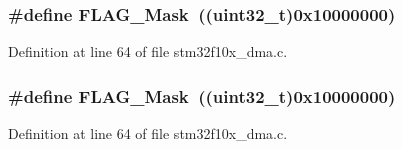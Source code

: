 \subsubsection[{\texorpdfstring{F\+L\+A\+G\+\_\+\+Mask}{FLAG_Mask}}]{\setlength{\rightskip}{0pt plus 5cm}\#define F\+L\+A\+G\+\_\+\+Mask~(({\bf uint32\+\_\+t})0x10000000)}\hypertarget{group___d_m_a___private___defines_ga2be62bf481cd44de9ab604efe5595ff6}{}\label{group___d_m_a___private___defines_ga2be62bf481cd44de9ab604efe5595ff6}


Definition at line 64 of file stm32f10x\+\_\+dma.\+c.

\subsubsection[{\texorpdfstring{F\+L\+A\+G\+\_\+\+Mask}{FLAG_Mask}}]{\setlength{\rightskip}{0pt plus 5cm}\#define F\+L\+A\+G\+\_\+\+Mask~(({\bf uint32\+\_\+t})0x10000000)}\hypertarget{group___d_m_a___private___defines_ga2be62bf481cd44de9ab604efe5595ff6}{}\label{group___d_m_a___private___defines_ga2be62bf481cd44de9ab604efe5595ff6}


Definition at line 64 of file stm32f10x\+\_\+dma.\+c.

